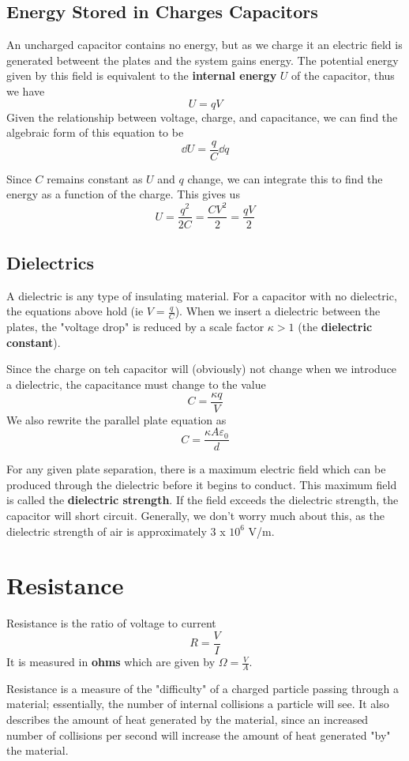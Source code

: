\documentclass[12pt]{article}
\begin{document}
\subsection*{Energy Stored in Charges Capacitors}
An uncharged capacitor contains no energy, but as we charge it an electric field is generated betweent the plates and the system gains energy. The potential energy given by this field is equivalent to the {\bf internal energy} $U$ of the capacitor, thus we have \[ U = qV \] Given the relationship between voltage, charge, and capacitance, we can find the algebraic form of this equation to be \[ \dd U = \frac{q}{C} \dd q \]

Since $C$ remains constant as $U$ and $q$ change, we can integrate this to find the energy as a function of the charge. This gives us \[ U = \frac{q^2}{2C} = \frac{CV^2}{2} = \frac{qV}{2} \]

\subsection*{Dielectrics}
A dielectric is any type of insulating material. For a capacitor with no dielectric, the equations above hold (ie $V = \frac{q}{C}$). When we insert a dielectric between the plates, the "voltage drop" is reduced by a scale factor $\kappa > 1$ (the {\bf dielectric constant}).

Since the charge on teh capacitor will (obviously) not change when we introduce a dielectric, the capacitance must change to the value \[ C = \frac{\kappa q}{V} \] We also rewrite the parallel plate equation as \[ C = \frac{\kappa A \varepsilon_0}{d} \]

For any given plate separation, there is a maximum electric field which can be produced through the dielectric before it begins to conduct. This maximum field is called the {\bf dielectric strength}. If the field exceeds the dielectric strength, the capacitor will short circuit. Generally, we don't worry much about this, as the dielectric strength of air is approximately $3$ x $10^6$ V/m.

\section*{Resistance}
Resistance is the ratio of voltage to current \[ R = \frac{V}{I} \] It is measured in {\bf ohms}  which are given by $\Omega = \frac{V}{A}$.

Resistance is a measure of the "difficulty" of a charged particle passing through a material; essentially, the number of internal collisions a particle will see. It also describes the amount of heat generated by the material, since an increased number of collisions per second will increase the amount of heat generated "by" the material.
\end{document}
